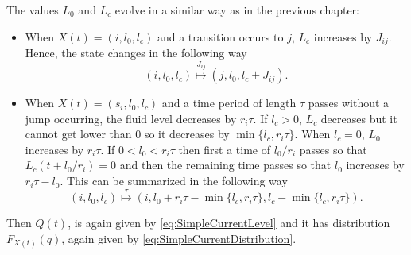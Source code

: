 \documentclass[a4paper]{thesis}
\theoremstyle{definition}
\begin{document}
The values $L_0$ and $L_c$ evolve in a similar way as in the previous chapter:
\begin{itemize}
	\item When $X(t)=(i,l_0,l_c)$ and a transition occurs to $j$, $L_c$ increases by $J_{ij}$.
	Hence, the state changes in the following way
	\begin{equation}\label{eq:MmfmJumpEvolution}
	(i,l_0,l_c)\stackrel{J_{ij}}{\mapsto} (j,l_0,l_c+J_{ij}).
	\end{equation}
	\item When $X(t)=(s_i,l_0,l_c)$ and a time period of length $\tau$ passes without a jump occurring, the fluid level decreases by $r_i\tau$.
	If $l_c>0$, $L_c$ decreases but it cannot get lower than $0$ so it decreases by $\min\{l_c,r_i\tau\}$.
	When $l_c=0$, $L_0$ increases by $r_i\tau$.
	If $0<l_0<r_i\tau$ then first a time of $l_0/r_i$ passes so that $L_c(t+l_0/r_i)=0$ and then the remaining time passes so that $l_0$ increases by $r_i\tau-l_0$.
	This can be summarized in the following way
	\begin{equation}\label{eq:MmfmAgeEvolution}
	(i,l_0,l_c)\stackrel\tau\mapsto (i,l_0+r_i\tau-\min\{l_c,r_i\tau\},l_c-\min\{l_c,r_i\tau\}).
	\end{equation}
\end{itemize}
Then $Q(t)$, is again given by \eqref{eq:SimpleCurrentLevel} and it has distribution $F_{X(t)}(q)$,  again given by \eqref{eq:SimpleCurrentDistribution}.
\end{document}
